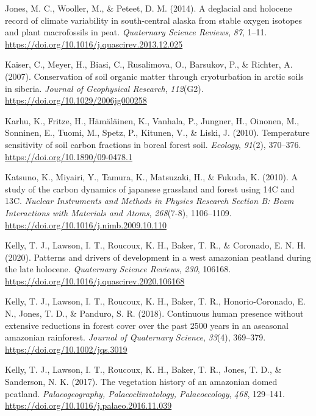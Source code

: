 \documentclass[]{article}
\begin{document}
\leavevmode\hypertarget{ref-Jones_2014}{}%
Jones, M. C., Wooller, M., \& Peteet, D. M. (2014). A deglacial and
holocene record of climate variability in south-central alaska from
stable oxygen isotopes and plant macrofossils in peat. \emph{Quaternary
Science Reviews}, \emph{87}, 1--11.
\url{https://doi.org/10.1016/j.quascirev.2013.12.025}

\leavevmode\hypertarget{ref-Kaiser_2007}{}%
Kaiser, C., Meyer, H., Biasi, C., Rusalimova, O., Barsukov, P., \&
Richter, A. (2007). Conservation of soil organic matter through
cryoturbation in arctic soils in siberia. \emph{Journal of Geophysical
Research}, \emph{112}(G2). \url{https://doi.org/10.1029/2006jg000258}

\leavevmode\hypertarget{ref-Karhu_2010}{}%
Karhu, K., Fritze, H., Hämäläinen, K., Vanhala, P., Jungner, H.,
Oinonen, M., Sonninen, E., Tuomi, M., Spetz, P., Kitunen, V., \& Liski,
J. (2010). Temperature sensitivity of soil carbon fractions in boreal
forest soil. \emph{Ecology}, \emph{91}(2), 370--376.
\url{https://doi.org/10.1890/09-0478.1}

\leavevmode\hypertarget{ref-Katsuno_2010}{}%
Katsuno, K., Miyairi, Y., Tamura, K., Matsuzaki, H., \& Fukuda, K.
(2010). A study of the carbon dynamics of japanese grassland and forest
using 14C and 13C. \emph{Nuclear Instruments and Methods in Physics
Research Section B: Beam Interactions with Materials and Atoms},
\emph{268}(7-8), 1106--1109.
\url{https://doi.org/10.1016/j.nimb.2009.10.110}

\leavevmode\hypertarget{ref-Kelly_2020}{}%
Kelly, T. J., Lawson, I. T., Roucoux, K. H., Baker, T. R., \& Coronado,
E. N. H. (2020). Patterns and drivers of development in a west amazonian
peatland during the late holocene. \emph{Quaternary Science Reviews},
\emph{230}, 106168.
\url{https://doi.org/10.1016/j.quascirev.2020.106168}

\leavevmode\hypertarget{ref-Kelly_2018}{}%
Kelly, T. J., Lawson, I. T., Roucoux, K. H., Baker, T. R.,
Honorio-Coronado, E. N., Jones, T. D., \& Panduro, S. R. (2018).
Continuous human presence without extensive reductions in forest cover
over the past 2500 years in an aseasonal amazonian rainforest.
\emph{Journal of Quaternary Science}, \emph{33}(4), 369--379.
\url{https://doi.org/10.1002/jqs.3019}

\leavevmode\hypertarget{ref-Kelly_2017}{}%
Kelly, T. J., Lawson, I. T., Roucoux, K. H., Baker, T. R., Jones, T. D.,
\& Sanderson, N. K. (2017). The vegetation history of an amazonian domed
peatland. \emph{Palaeogeography, Palaeoclimatology, Palaeoecology},
\emph{468}, 129--141. \url{https://doi.org/10.1016/j.palaeo.2016.11.039}
\end{document}
